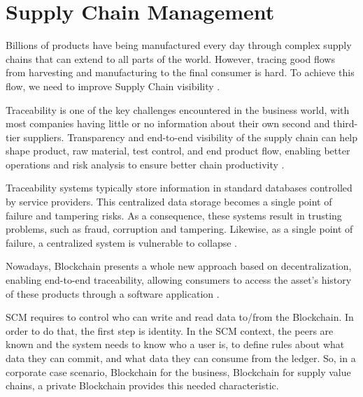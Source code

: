 \section{Supply Chain Management} \label{sec:General}

Billions of products have being manufactured every day through complex supply chains that can extend to all parts of the world. However, tracing good flows from harvesting and manufacturing to the final consumer is hard. To achieve this flow, we need to improve Supply Chain visibility \cite{galvez2018future}. %

Traceability is one of the key challenges encountered in the business world, with most companies having little or no information about their own second and third-tier suppliers. Transparency and end-to-end visibility of the supply chain can help shape product, raw material, test control, and end product flow, enabling better operations and risk analysis to ensure better chain productivity \cite{abeyratne2016blockchain}.

Traceability systems typically store information in standard databases controlled by service providers. This centralized data storage becomes a single point of failure and tampering risks. As a consequence, these systems result in trusting problems, such as fraud, corruption and tampering. Likewise, as a single point of failure, a centralized system is vulnerable to collapse \cite{tian2017supply}.

Nowadays, Blockchain presents a whole new approach based on decentralization, enabling end-to-end traceability, allowing consumers to access the asset's history of these products through a software application \cite{galvez2018future}.

SCM requires to control who can write and read data to/from the Blockchain. In order to do that, the first step is identity. In the SCM context, the peers are known and the system needs to know who a user is, to define rules about what data they can commit, and what data they can consume from the ledger. So, in a corporate case scenario, Blockchain for the business, Blockchain for supply value chains, a private Blockchain provides this needed characteristic.